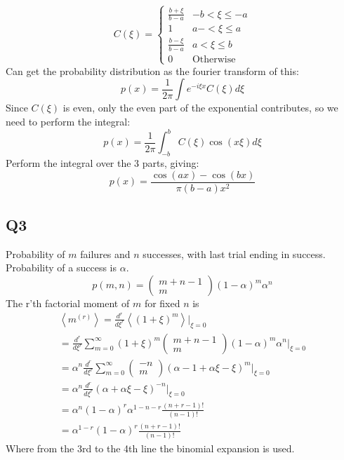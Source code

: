 \documentclass[../main.tex]{subfiles}
\begin{document}
\begin{equation}
	C(\xi) = 
	\begin{cases}
		\frac{b+\xi}{b-a} & -b<\xi\leq-a \\
		1 & a-<\xi\leq a\\
		\frac{b-\xi}{b-a} & a<\xi\leq b \\
		0 & \text{Otherwise}
	\end{cases}
\end{equation}
Can get the probability distribution as the fourier transform of this:
\begin{equation}
	p(x) = \frac{1}{2\pi}\int e^{-i\xi x}C(\xi)d\xi
\end{equation}
Since $C(\xi)$ is even, only the even part of the exponential contributes, so we need to perform the integral:
\begin{equation}
	p(x) = \frac{1}{2\pi}\int_{-b}^b C(\xi)\cos(x\xi)d\xi
\end{equation}
Perform the integral over the 3 parts, giving:
\begin{equation}
	p(x) = \frac{\cos(ax)-\cos(bx)}{\pi(b-a)x^2}
\end{equation}
\subsection{Q3}
Probability of $m$ failures and $n$ successes, with last trial ending in success. Probability of a success is $\alpha$.
\begin{equation}
	p(m, n) = \left(\begin{matrix}m+n-1\\m\end{matrix}\right)(1-\alpha)^m\alpha^n
\end{equation}
The r'th factorial moment of $m$ for fixed $n$ is
\begin{align*}
	\left<m^{(r)}\right>=\frac{d^r}{d\xi^r}\left<(1+\xi)^m\right>\Big |_{\xi=0} \\
			    =\frac{d^r}{d\xi^r}\sum_{m=0}^\infty (1+\xi)^m \left(\begin{matrix}m+n-1\\m\end{matrix}\right)(1-\alpha)^m\alpha^n\Big|_{\xi=0} \\
			    =\alpha^n\frac{d^r}{d\xi^r}\sum_{m=0}^\infty\left(\begin{matrix}-n\\m\end{matrix}\right)(\alpha-1+\alpha\xi-\xi)^m\Big|_{\xi=0} \\
			    =\alpha^n \frac{d^r}{d\xi^r}(\alpha+\alpha\xi-\xi)^{-n}\Big|_{\xi=0} \\
			    =\alpha^n (1-\alpha)^r\alpha^{1-n-r}\frac{(n+r-1)!}{(n-1)!} \\
			    =\alpha^{1-r}(1-\alpha)^r\frac{(n+r-1)!}{(n-1)!}
\end{align*}
Where from the 3rd to the 4th line the binomial expansion is used.
\end{document}
